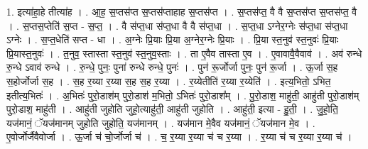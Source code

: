 \documentclass[17pt]{extarticle}
\begin{document}
1. इत्या॑हा॒हे तीत्या॑ह । . आ॒ह॒ स॒प्तस॑प्त स॒प्तस॑प्ताहाह स॒प्तस॑प्त । . स॒प्तस॑प्त॒ वै वै स॒प्तस॑प्त स॒प्तस॑प्त॒ वै । . स॒प्तस॒प्तेति॑ स॒प्त - स॒प्त॒ । . वै स॑प्त॒धा स॑प्त॒धा वै वै स॑प्त॒धा । . स॒प्त॒धा ऽग्नेर॒ग्नेः स॑प्त॒धा स॑प्त॒धा ऽग्नेः । . स॒प्त॒धेति॑ सप्त - धा । . अ॒ग्नेः प्रि॒याः प्रि॒या अ॒ग्नेर॒ग्नेः प्रि॒याः । . प्रि॒या स्त॒नुव॑ स्त॒नुवः॑ प्रि॒याः प्रि॒यास्त॒नुवः॑ । . त॒नुव॒ स्तास्ता स्त॒नुव॑ स्त॒नुव॒स्ताः । . ता ए॒वैव तास्ता ए॒व । . ए॒वावावै॒वैवाव॑ । . अव॑ रुन्धे रु॒न्धे ऽवाव॑ रुन्धे । . रु॒न्धे॒ पुनः॒ पुना॑ रुन्धे रुन्धे॒ पुनः॑ । . पुन॑ रू॒र्जोर्जा पुनः॒ पुन॑ रू॒र्जा । . ऊ॒र्जा स॒ह स॒होर्जोर्जा स॒ह । . स॒ह र॒य्या र॒य्या स॒ह स॒ह र॒य्या । . र॒य्येतीति॑ र॒य्या र॒य्येति॑ । . इत्य॒भितो॒ ऽभित॒ इतीत्य॒भितः॑ । . अ॒भितः॑ पुरो॒डाश॑म् पुरो॒डाश॑ म॒भितो॒ ऽभितः॑ पुरो॒डाश᳚म् । . पु॒रो॒डाश॒ माहु॑ती॒ आहु॑ती पुरो॒डाश॑म् पुरो॒डाश॒ माहु॑ती । . आहु॑ती जुहोति जुहो॒त्याहु॑ती॒ आहु॑ती जुहोति । . आहु॑ती॒ इत्या - हु॒ती॒ । . जु॒हो॒ति॒ यज॑मानं॒ ॅयज॑मानम् जुहोति जुहोति॒ यज॑मानम् । . यज॑मान मे॒वैव यज॑मानं॒ ॅयज॑मान मे॒व । . ए॒वोर्जोर्जैवैवोर्जा । . ऊ॒र्जा च॑ चो॒र्जोर्जा च॑ । . च॒ र॒य्या र॒य्या च॑ च र॒य्या । . र॒य्या च॑ च र॒य्या र॒य्या च॑ । \newline
\end{document}
